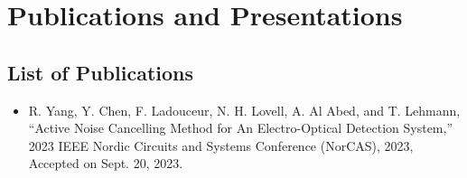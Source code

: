 \chapter{Publications and Presentations}

\section*{List of Publications}
 
\begin{itemize}
    \item R. Yang, Y. Chen, F. Ladouceur, N. H. Lovell, A. Al Abed, and T. Lehmann, ``Active Noise Cancelling Method for An Electro-Optical Detection System,'' 2023 IEEE Nordic Circuits and Systems Conference (NorCAS), 2023, Accepted on Sept. 20, 2023.
\end{itemize}



